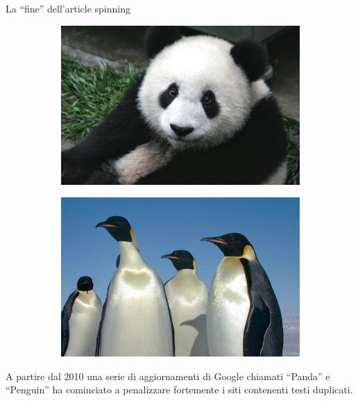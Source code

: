 \documentclass[12pt]{beamer}
\begin{document}
  \begin{frame}{La ``fine'' dell'article spinning}
    \begin{figure}
      \centering
      \begin{subfigure}[b]{0.45\textwidth}
        \centering
        \includegraphics[width=\textwidth]{tex/img/panda}
      \end{subfigure}
      \hspace{0.05\textwidth}
      \begin{subfigure}[b]{0.45\textwidth}
        \centering
        \includegraphics[width=\textwidth]{tex/img/penguins}
      \end{subfigure}
    \end{figure}

    A partire dal 2010 una serie di aggiornamenti di Google chiamati ``Panda'' e
    ``Penguin'' ha cominciato a penalizzare fortemente i siti contenenti testi
    duplicati.
  \end{frame}
\end{document}
